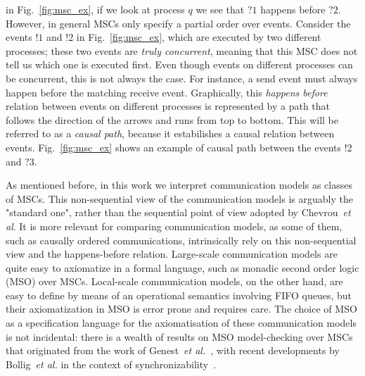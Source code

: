 in Fig.~\ref{fig:msc_ex}, if we look at process $q$ we see that $?1$ happens before $?2$. However, in general MSCs only specify a partial order
over events. Consider the events $!1$ and $!2$ in Fig.~\ref{fig:msc_ex}, which are executed by two different processes; these two events are \emph{truly concurrent}, meaning that this MSC does not tell us which one is executed first. Even though events on different processes can be concurrent, this is not always the case. For instance, a send event must always happen
before the matching receive event. Graphically, this \emph{happens before} relation between events on different processes is represented
by a path that follows the direction of the arrows and runs from top to bottom. This will be referred to as a \emph{causal path}, because it
estabilishes a causal relation between events. Fig.~\ref{fig:msc_ex} shows an example of causal path between the events $!2$ and $?3$. 






As mentioned before, in this work we interpret communication models as classes of MSCs.
This non-sequential view of the communication models is arguably the "standard one",
rather than the sequential point of view adopted by Chevrou~\emph{et al}. It is more relevant for comparing communication models, as some
of them, such as causally ordered communications, intrinsically rely on this non-sequential view and the happens-before relation. Large-scale communication models are quite easy to axiomatize in a formal language, such as monadic second order logic (MSO) over MSCs. Local-scale
communication models, on the other hand, are easy to define by means of an operational semantics involving FIFO queues, but their axiomatization
in MSO is error prone and requires care. The choice of MSO as a specification language for the axiomatisation of
these communication models is not incidental: there is a wealth of results on MSO model-checking over MSCs that originated from
the work of Genest~\emph{et al.}~\cite{genest2004kleene,GKM07}, with recent developments by Bollig~\emph{et al.} in the context
of synchronizability~\cite{BolligGFLLS21}.

